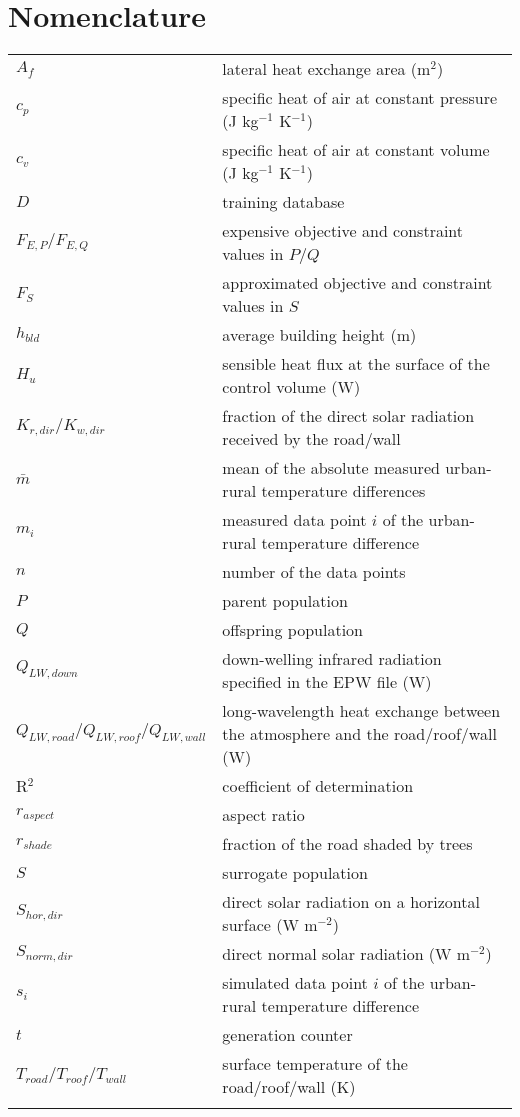\chapter*{Nomenclature}
\noindent
\begin{tabular}{p{3.5cm}p{11.5cm}}
$A_f$ & lateral heat exchange area (m$^2$) \\
$c_p$ & specific heat of air at constant pressure (J kg$^{-1}$ K$^{-1}$) \\
$c_v$ & specific heat of air at constant volume (J kg$^{-1}$ K$^{-1}$) \\
$D$ & training database \\
$F_{E,P}/F_{E,Q}$ & expensive objective and constraint values in $P/Q$ \\
$F_S$ & approximated objective and constraint values in $S$ \\
$h_{bld}$ & average building height (m) \\
$H_u$ & sensible heat flux at the surface of the control volume (W) \\
$K_{r,dir}/K_{w,dir}$ & fraction of the direct solar radiation received by the road/wall\\
$\bar{m}$ & mean of the absolute measured urban-rural temperature differences \\
$m_i$ & measured data point $i$ of the urban-rural temperature difference \\
$n$ & number of the data points \\
$P$ & parent population \\
$Q$ & offspring population \\
$Q_{LW,down}$ & down-welling infrared radiation specified in the EPW file (W) \\
$Q_{LW,road}/Q_{LW,roof}/Q_{LW,wall}$ & \qquad \qquad \qquad long-wavelength heat exchange between the atmosphere and the road/roof/wall (W) \\
R$^2$ & coefficient of determination\\
$r_{aspect}$ & aspect ratio\\
$r_{shade}$ & fraction of the road shaded by trees\\
$S$ & surrogate population \\
$S_{hor,dir}$ & direct solar radiation on a horizontal surface (W m$^{-2}$)\\
$S_{norm,dir}$ & direct normal solar radiation (W m$^{-2}$)\\
$s_i$ & simulated data point $i$ of the urban-rural temperature difference \\
$t$ & generation counter \\
$T_{road}/T_{roof}/T_{wall}$ & surface temperature of the road/roof/wall (K)\\
\multicolumn{2}{c}{}
\end{tabular}

